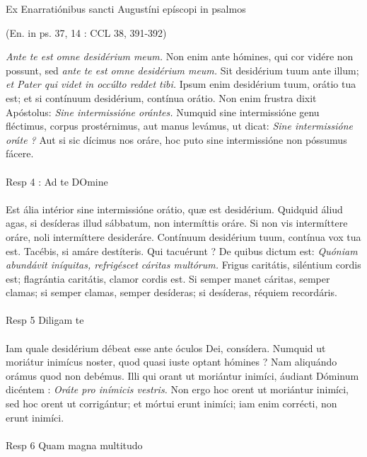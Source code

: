 \documentclass[options]{article}
\begin{document}
	
	Ex Enarratiónibus sancti Augustíni epíscopi in psalmos 
	\begin{flushright}
		(En. in ps. 37, 14 : CCL 38, 391-392)
	\end{flushright}
\emph{Ante te est omne desidérium meum.}
Non enim ante hómines, qui cor vidére non possunt, sed 
\emph{ante te est omne desidérium meum.}
Sit desidérium tuum ante illum;
\emph{et Pater qui videt in occúlto reddet tibi.}
Ipsum enim desidérium tuum, orátio tua est; et si contínuum desidérium, contínua orátio. Non enim frustra dixit Apóstolus:
\emph{Sine intermissióne orántes.}
 Numquid sine intermissióne genu fléctimus, corpus prostérnimus, aut manus levámus, ut dicat: 
 \emph{Sine intermissióne oráte ?}
 Aut si sic dícimus nos oráre, hoc puto sine intermissióne non póssumus fácere.\\
 \\
 Resp 4 : Ad te DOmine\\
\\
Est ália intérior sine intermissióne orátio, quæ est desidérium. Quidquid áliud agas, si desíderas illud sábbatum, non intermíttis oráre. Si non vis intermíttere oráre, noli intermíttere desideráre. Contínuum desidérium tuum, contínua vox tua est. Tacébis, si amáre destíteris. Qui tacuérunt ? De quibus dictum est: 
\emph{Quóniam abundávit iníquitas, refrigéscet cáritas multórum.}
Frigus caritátis, siléntium cordis est; flagrántia caritátis, clamor cordis est. Si semper manet cáritas, semper clamas; si semper clamas, semper desíderas; si desíderas, réquiem recordáris.\\
\\
Resp 5 Diligam te\\
\\
Iam quale desidérium débeat esse ante óculos Dei, consídera. Numquid ut moriátur inimícus noster, quod quasi iuste optant hómines ? Nam aliquándo orámus quod non debémus. Illi qui orant ut moriántur inimíci, áudiant Dóminum dicéntem : 
\emph{Oráte pro inímicis vestris.}
Non ergo hoc orent ut moriántur inimíci, sed hoc orent ut corrigántur; et mórtui erunt inimíci; iam enim corrécti, non erunt inimíci.\\
\\
Resp 6 Quam magna multitudo
\\
\end{document}
